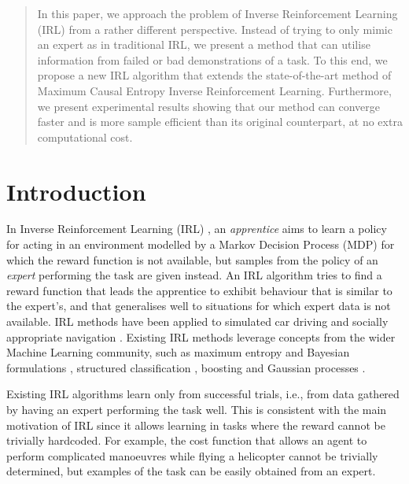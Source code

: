\documentclass[conference]{IEEEtran}
\begin{document}
\begin{abstract}
In this paper, we approach the problem of Inverse Reinforcement Learning (IRL) from a rather different perspective. Instead of trying to only mimic an expert as in traditional IRL, we present a method that can utilise information from failed or bad demonstrations of a task. To this end, we propose a new IRL algorithm that extends the state-of-the-art method of Maximum Causal Entropy Inverse Reinforcement Learning. Furthermore, we present experimental results showing that our method can converge faster and is more sample efficient than its original counterpart, at no extra computational cost. 
\end{abstract}

\IEEEpeerreviewmaketitle

\section{Introduction}
In Inverse Reinforcement Learning (IRL) \cite{ng2000algorithms}, an \emph{apprentice} aims to learn a policy for acting in an environment modelled by a Markov Decision Process (MDP) for which the reward function is not available, but samples from the policy of an \emph{expert} performing the task are given instead. An IRL algorithm tries to find a reward function that leads the apprentice to exhibit behaviour that is similar to the expert's, and that generalises well to situations for which expert data is not available. %
IRL methods have been applied to simulated car driving \cite{abbeel2004apprenticeship} and socially appropriate navigation \cite{henry2010learning,vasquez2014inverse}. Existing IRL methods leverage concepts from the wider Machine Learning community, such as maximum entropy \cite{ziebart2008maximum} and Bayesian formulations \cite{ramachandran2007bayesian}, structured classification \cite{ratliff2006maximum}, boosting \cite{ratliff2007boosting} and Gaussian processes \cite{levine2011nonlinear}.

Existing IRL algorithms learn only from successful trials, i.e., from data gathered by having an expert performing the task well. This is consistent with the main motivation of IRL since it allows learning in tasks where the reward cannot be trivially hardcoded.  For example, the cost function that allows an agent to perform complicated manoeuvres while flying a helicopter cannot be trivially determined, but examples of the task can be easily obtained from an expert.
\end{document}
